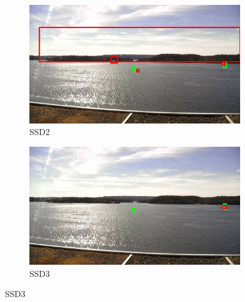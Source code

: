 \begin{figure}
\begin{subfigure}{.5\textwidth}
  \centering
  \includegraphics[width=0.9\linewidth]{results/case_buildings/bigbox_bcbf/SSD2/selected_08_07_frame1916.jpg}
  \caption{SSD2}
  \label{fig:sfig1}
\end{subfigure}%
\begin{subfigure}{.5\textwidth}
  \centering
  \includegraphics[width=.9\linewidth]{results/case_buildings/bigbox_bcbf/SSD3/selected_08_07_frame1916.jpg}
  \caption{SSD3}
  \label{fig:sfig2}
\end{subfigure}


\end{figure}
